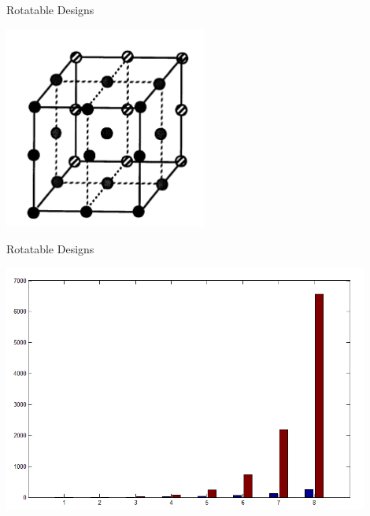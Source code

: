 \documentclass[14pt]{beamer}
\begin{document}
\begin{frame}{Rotatable Designs}
\begin{center}
\includegraphics[width=0.5\textwidth]{3level3factor.png}
\end{center}
\end{frame}

\begin{frame}{Rotatable Designs}
\begin{center}
\includegraphics[width=0.9\textwidth]{3levels.png}
\end{center}
\end{frame}
\end{document}
